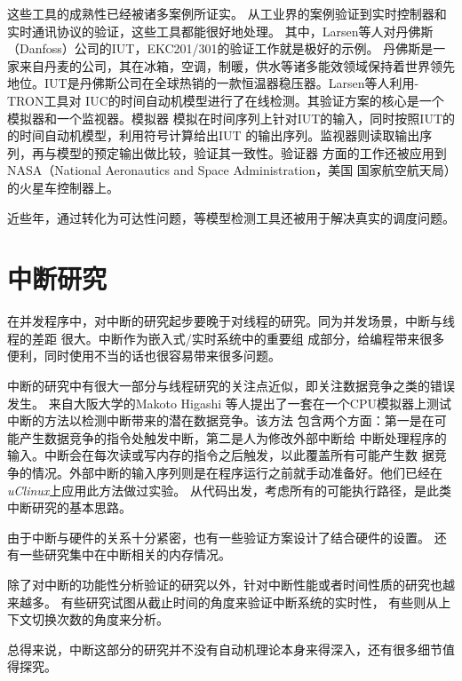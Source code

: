 这些工具的成熟性已经被诸多案例所证实。\cite{D'Argenio:1997:BRP:646481.691445,Ernits:2005:MAS:1124427.1124429,Hen05a,Jensen:2000:SUU:646846.706958,Lamport:2005:RMC:2156375.2156396,Larsen:2005:TRE:1086228.1086283,Lindahl:1998:FDA:646482.691449}
从工业界的案例验证到实时控制器和实时通讯协议的验证，这些工具都能很好地处理。
其中，Larsen等人对丹佛斯（Danfoss）公司的IUT，EKC201/301的验证工作就是极好的示例。
丹佛斯是一家来自丹麦的公司，其在冰箱，空调，制暖，供水等诸多能效领域保持着世界领先
地位。IUT是丹佛斯公司在全球热销的一款恒温器稳压器。Larsen等人利用\uppaal-TRON工具对
IUC的时间自动机模型进行了在线检测。其验证方案的核心是一个模拟器和一个监视器。模拟器
模拟在时间序列上针对IUT的输入，同时按照IUT的的时间自动机模型，利用符号计算给出IUT
的输出序列。监视器则读取输出序列，再与模型的预定输出做比较，验证其一致性。验证器
方面的工作还被应用到NASA（National Aeronautics and Space Administration，美国
国家航空航天局）的火星车控制器上。\cite{Larsen:2005:TRE:1086228.1086283}

近些年，通过转化为可达性问题，\uppaal 等模型检测工具还被用于解决真实的调度问题。
\cite{Abdeddaim:1,Fehnker:811256,Hune:2001:GSC:774194.774198,Bouyer06timedunfoldings}

\section{中断研究}
\label{sec:intr_study}

在并发程序中，对中断的研究起步要晚于对线程的研究。同为并发场景，中断与线程的差距
很大。\cite{Regehr:2007:IVV:1268075.1268150}中断作为嵌入式/实时系统中的重要组
成部分，给编程带来很多便利，同时使用不当的话也很容易带来很多问题。\cite{Lee:2007:HRE:1534850}

中断的研究中有很大一部分与线程研究的关注点近似，即关注数据竞争之类的错误发生。
\cite{6004502, DBLP:journals/ijdsn/TchamgoueKJ13}来自大阪大学的Makoto Higashi
等人提出了一套在一个CPU模拟器上测试中断的方法以检测中断带来的潜在数据竞争。该方法
包含两个方面：第一是在可能产生数据竞争的指令处触发中断，第二是人为修改外部中断给
中断处理程序的输入。中断会在每次读或写内存的指令之后触发，以此覆盖所有可能产生数
据竞争的情况。外部中断的输入序列则是在程序运行之前就手动准备好。他们已经在
\emph{uClinux}上应用此方法做过实验。\cite{Higashi:2010:EMC:1808266.1808278}
从代码出发，考虑所有的可能执行路径，是此类中断研究的基本思路。

由于中断与硬件的关系十分紧密，也有一些验证方案设计了结合硬件的设置。\cite{Yang:4261310}
还有一些研究集中在中断相关的内存情况。\cite{Chatterjee:2003:SSA:1760267.1760276}

除了对中断的功能性分析验证的研究以外，针对中断性能或者时间性质的研究也越来越多。
有些研究试图从截止时间的角度来验证中断系统的实时性\cite{10.1109/TSE.2004.64}，
有些则从上下文切换次数的角度来分析\cite{6148915}。

总得来说，中断这部分的研究并不没有自动机理论本身来得深入，还有很多细节值得探究。


